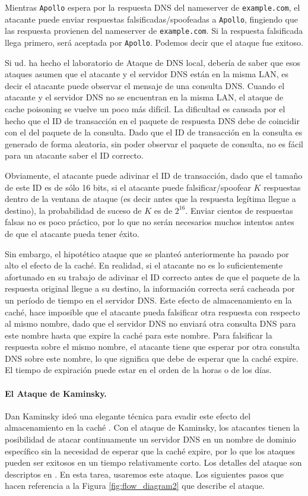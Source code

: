 Mientras {\tt Apollo} espera por la respuesta DNS del nameserver de  {\tt example.com}, el atacante puede enviar respuestas falsificadas/spoofeadas a {\tt Apollo}, fingiendo que las respuesta provienen del nameserver de {\tt example.com}. Si la respuesta falsificada llega primero, será aceptada por {\tt Apollo}. Podemos decir que el ataque fue exitoso.

Si ud. ha hecho el laboratorio de Ataque de DNS local, debería de saber que esos ataques asumen que el atacante y el servidor DNS están en la misma LAN, es decir el atacante puede observar el mensaje de una consulta DNS.
Cuando el atacante y el servidor DNS no se encuentran en la misma LAN, el ataque de cache poisoning se vuelve un poco más difícil.
La dificultad es causada por el hecho que el ID de transacción en el paquete de respuesta DNS debe de coincidir con el del paquete de la consulta. Dado que el ID de transacción en la consulta es generado de forma aleatoria, sin poder observar el paquete de consulta, no es fácil para un atacante saber el ID correcto.

Obviamente, el atacante puede adivinar el ID de transacción, dado que el tamaño de este ID es de sólo 16 bits, si el atacante puede falsificar/spoofear $K$ respuestas dentro de la ventana de ataque (es decir antes que la respuesta legítima llegue a destino), la probabilidad de suceso de $K$ es de $2^{16}$. 
Enviar cientos de respuestas falsas no es poco práctico, por lo que
no serán necesarios muchos intentos antes de que el atacante pueda tener éxito.

Sin embargo, el hipotético ataque que se planteó anteriormente ha pasado por alto el efecto de la caché.
En realidad, si el atacante no es lo suficientemente afortunado en su trabajo de adivinar el ID correcto antes de que el paquete de la respuesta original llegue a su destino, la información correcta será cacheada por un período de tiempo en el servidor DNS. Este efecto de almacenamiento en la caché, hace imposible que el atacante pueda falsificar otra respuesta con respecto al mismo nombre, dado que el servidor DNS no enviará otra consulta DNS para este nombre hasta que expire la caché para este nombre.
Para falsificar la respuesta sobre el mismo nombre, el atacante tiene que esperar por otra consulta DNS sobre este nombre, lo que significa que debe de esperar que la caché expire. El tiempo de expiración puede estar en el orden de la horas o de los días.


\paragraph{El Ataque de Kaminsky.} 
Dan Kaminsky ideó una elegante técnica para evadir este efecto del almacenamiento en la caché \cite{dns:Kaminsky}.
Con el ataque de Kaminsky, los atacantes tienen la posibilidad de atacar continuamente un servidor DNS en un nombre de dominio específico sin la necesidad de esperar que la caché expire, por lo que los ataques pueden ser exitosos en un tiempo relativamente corto. 
Los detalles del ataque son descriptos en \cite{dns:Kaminsky,seedbook}. 
En esta tarea, usaremos este ataque. Los siguientes pasos que hacen referencia a la Figura \ref{fig:flow_diagram2} que describe el ataque.


